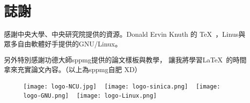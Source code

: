 \documentclass[class=NCNU_thesis, crop=false]{standalone}
\begin{document}
\chapter{誌謝}

感謝中央大學、中央研究院提供的資源。Donald Ervin Knuth 的 \TeX\ ，Linus與眾多自由軟體好手提供的GNU/Linux。

另外特別感謝功德大師sppmg提供的論文樣板與教學\cite{_sppmg/tw_thesis_template_????}，
讓我將學習\LaTeX\ 的時間拿來充實論文內容。（以上為sppmg自肥 XD）

\begin{figure}[!hbt]
    \captionsetup[subfigure]{labelformat=empty}
    \centering
    \subcaptionbox
        {}
        {\texttt{[image: logo-NCU.jpg]}}
    ~
    \subcaptionbox
        {}
        {\texttt{[image: logo-sinica.png]}}
    ~
    \subcaptionbox
        {}
        {\texttt{[image: logo-GNU.png]}}
    ~
    \subcaptionbox
        {}
        {\texttt{[image: logo-Linux.png]}}
\end{figure}
\end{document}
